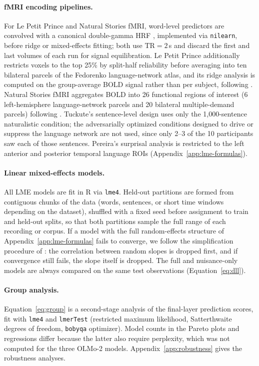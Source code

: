 \paragraph{fMRI encoding pipelines.} For Le Petit Prince and Natural Stories fMRI, word-level predictors are convolved with a canonical double-gamma HRF \citep{glover1999deconvolution}, implemented via \texttt{nilearn}, before ridge or mixed-effects fitting; both use $\mathrm{TR}=2$\,s and discard the first and last volumes of each run for signal equilibration. Le Petit Prince additionally restricts voxels to the top 25\% by split-half reliability before averaging into ten bilateral parcels of the Fedorenko language-network atlas, and its ridge analysis is computed on the group-average BOLD signal rather than per subject, following \citet{bonnasse2024fmri}. Natural Stories fMRI aggregates BOLD into 26 functional regions of interest (6 left-hemisphere language-network parcels and 20 bilateral multiple-demand parcels) following \citet{shain2022robust}. Tuckute's sentence-level design uses only the 1,000-sentence naturalistic condition; the adversarially optimized conditions designed to drive or suppress the language network are not used, since only 2--3 of the 10 participants saw each of those sentences. Pereira's surprisal analysis is restricted to the left anterior and posterior temporal language ROIs (Appendix~\ref{app:lme-formulas}).

\paragraph{Linear mixed-effects models.} All LME models are fit in R via \texttt{lme4}. Held-out partitions are formed from contiguous chunks of the data (words, sentences, or short time windows depending on the dataset), shuffled with a fixed seed before assignment to train and held-out splits, so that both partitions sample the full range of each recording or corpus. If a model with the full random-effects structure of Appendix~\ref{app:lme-formulas} fails to converge, we follow the simplification procedure of \citet{barr2013random}: the correlation between random slopes is dropped first, and if convergence still fails, the slope itself is dropped. The full and nuisance-only models are always compared on the same test observations (Equation~\ref{eq:dll}).

\paragraph{Group analysis.} Equation~\ref{eq:group} is a second-stage analysis of the final-layer prediction scores, fit with \texttt{lme4} and \texttt{lmerTest} (restricted maximum likelihood, Satterthwaite degrees of freedom, \texttt{bobyqa} optimizer). Model counts in the Pareto plots and regressions differ because the latter also require perplexity, which was not computed for the three OLMo-2 models. Appendix~\ref{app:robustness} gives the robustness analyses.

